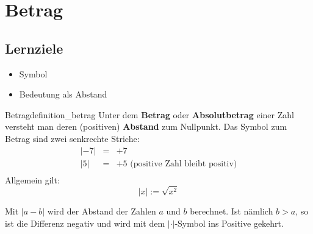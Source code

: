 
\section{Betrag}


\subsection*{Lernziele}

\begin{itemize}
  \item Symbol
  \item Bedeutung als Abstand
\end{itemize}


%
%





\begin{definition}{Betrag}{definition_betrag}
  Unter dem \textbf{Betrag} oder \textbf{Absolutbetrag} einer Zahl versteht man deren (positiven)
  \textbf{Abstand} zum Nullpunkt. Das Symbol zum Betrag sind zwei
  senkrechte Striche:\\
  $$\begin{array}{rcl}
    |-7| & = & +7\\
    | 5| & = & +5  \text{ (positive Zahl bleibt positiv)}\\
  \end{array}$$
  Allgemein gilt:
  $$|x| := \sqrt{x^2}$$
\end{definition}
\newpage


\begin{bemerkung}{}{}
Mit $|a - b|$ wird der Abstand der Zahlen $a$ und $b$ berechnet. Ist
nämlich $b > a$, so ist die Differenz negativ und wird mit dem
$| \cdot{} |$-Symbol ins Positive gekehrt.
\end{bemerkung}

